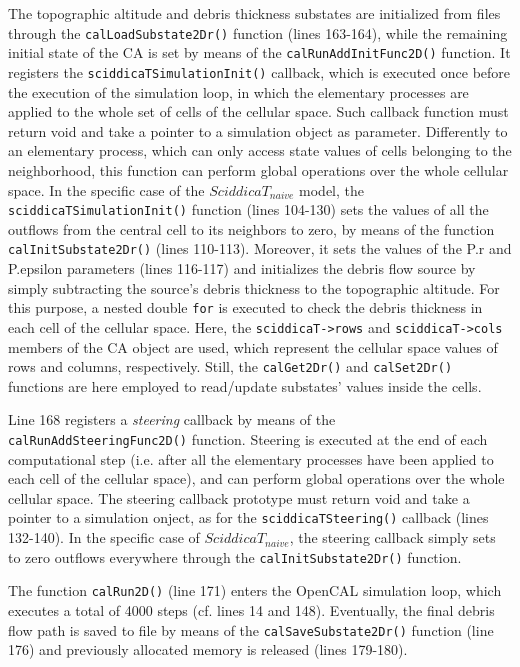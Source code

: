 The topographic altitude and debris thickness substates are
initialized from files through the \verb'calLoadSubstate2Dr()'
function (lines 163-164), while the remaining initial state of the CA
is set by means of the \verb'calRunAddInitFunc2D()' function. It
registers the \verb'sciddicaTSimulationInit()' callback, which is
executed once before the execution of the simulation loop, in which
the elementary processes are applied to the whole set of cells of the
cellular space. Such callback function must return void and take a
pointer to a simulation object as parameter. Differently to an
elementary process, which can only access state values of cells
belonging to the neighborhood, this function can perform global
operations over the whole cellular space. In the specific case of the
$SciddicaT_{naive}$ model, the \verb'sciddicaTSimulationInit()'
function (lines 104-130) sets the values of all the outflows from the
central cell to its neighbors to zero, by means of the function
\verb'calInitSubstate2Dr()' (lines 110-113). Moreover, it sets the
values of the P.r and P.epsilon parameters (lines 116-117) and
initializes the debris flow source by simply subtracting the source's
debris thickness to the topographic altitude. For this purpose, a
nested double \verb'for' is executed to check the debris thickness in
each cell of the cellular space. Here, the \verb'sciddicaT->rows' and
\verb'sciddicaT->cols' members of the CA object are used, which
represent the cellular space values of rows and columns,
respectively. Still, the \verb'calGet2Dr()' and \verb'calSet2Dr()'
functions are here employed to read/update substates' values inside
the cells.

Line 168 registers a \emph{steering} callback by means of the
\verb'calRunAddSteeringFunc2D()' function. Steering is executed at the
end of each computational step (i.e. after all the elementary
processes have been applied to each cell of the cellular space), and
can perform global operations over the whole cellular space. The
steering callback prototype must return void and take a pointer to a
simulation onject, as for the \verb'sciddicaTSteering()' callback
(lines 132-140). In the specific case of $SciddicaT_{naive}$, the
steering callback simply sets to zero outflows everywhere through the
\verb'calInitSubstate2Dr()' function.

The function \verb'calRun2D()' (line 171) enters the OpenCAL
simulation loop, which executes a total of 4000 steps (cf. lines 14
and 148). Eventually, the final debris flow path is saved to file by
means of the \verb'calSaveSubstate2Dr()' function (line 176) and
previously allocated memory is released (lines 179-180).

